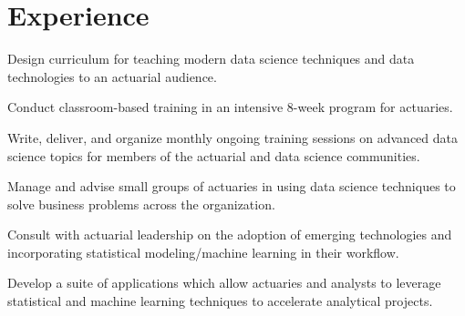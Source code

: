 \documentclass[letterpaper]{deedy-resume} %
\begin{document}
\begin{minipage}[t]{0.65\textwidth} %


\section{Experience}
\hfill{}
\hfill
{}
\vspace{\topsep}
\begin{tightitemize}
\item Design curriculum for teaching modern data science techniques and data
  technologies to an actuarial audience.
\item Conduct classroom-based training in an intensive 8-week program
  for actuaries.
\item Write, deliver, and organize monthly ongoing training sessions on advanced
  data science topics for members of the actuarial and data science communities.
\item Manage and advise small groups of actuaries in using data science
  techniques to solve business problems across the organization.
\item Consult with actuarial leadership on the adoption of emerging technologies
  and incorporating statistical modeling/machine learning in their workflow.
\item Develop a suite of applications which allow actuaries and analysts to
  leverage statistical and machine learning techniques to accelerate analytical
  projects. 
\end{tightitemize}
\sectionspace


\end{minipage}
\end{document}

